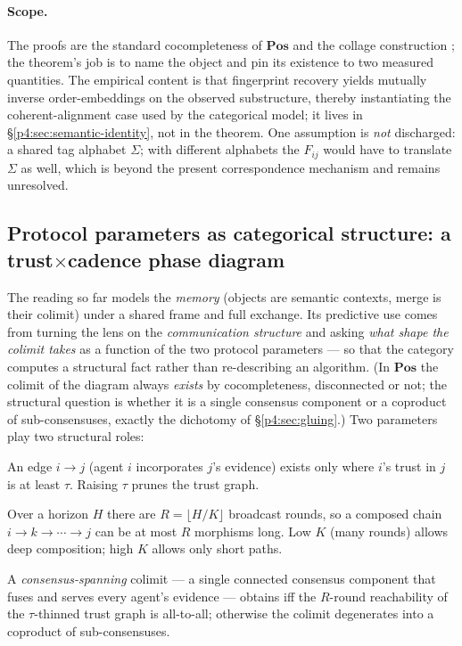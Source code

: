 \documentclass{article}
\begin{document}
\paragraph{Scope.} The proofs are the standard cocompleteness of $\mathbf{Pos}$
and the collage construction \citep{maclane1998categories}; the theorem's job
is to name the object and pin its existence to two measured quantities. The
empirical content is that fingerprint recovery yields mutually inverse
order-embeddings on the observed substructure, thereby instantiating the
coherent-alignment case used by the categorical model; it lives in
\S\ref{p4:sec:semantic-identity}, not in the theorem. One
assumption is \emph{not} discharged: a shared tag alphabet $\Sigma$; with
different alphabets the $F_{ij}$ would have to translate $\Sigma$ as well,
which is beyond the present correspondence mechanism and remains unresolved.

\subsection{Protocol parameters as categorical structure: a trust\texorpdfstring{$\times$}{x}cadence phase diagram}
\label{p4:sec:phase-diagram}

The reading so far models the \emph{memory} (objects are semantic contexts,
merge is their colimit) under a shared frame and full exchange. Its
predictive use comes from turning the lens on the \emph{communication
structure} and asking \emph{what shape the colimit takes} as a function of
the two protocol parameters --- so that the category computes a structural
fact rather than re-describing an algorithm. (In $\mathbf{Pos}$ the colimit
of the diagram always \emph{exists} by cocompleteness, disconnected or not;
the structural question is whether it is a single consensus component or a
coproduct of sub-consensuses, exactly the dichotomy of \S\ref{p4:sec:gluing}.) Two parameters play two structural roles:
\begin{description}[leftmargin=12pt,topsep=2pt,itemsep=1pt]
\item[Trust $\tau$ gates morphisms.] An edge $i\!\to\!j$ (agent $i$
incorporates $j$'s evidence) exists only where $i$'s trust in $j$ is at least
$\tau$. Raising $\tau$ prunes the trust graph.
\item[Cadence $K$ gates composition depth.] Over a horizon $H$ there are
$R=\lfloor H/K\rfloor$ broadcast rounds, so a composed chain
$i\!\to\!k\!\to\!\cdots\!\to\!j$ can be at most $R$ morphisms long. Low $K$
(many rounds) allows deep composition; high $K$ allows only short paths.
\end{description}
A \emph{consensus-spanning} colimit --- a single connected consensus
component that fuses and serves every agent's evidence --- obtains iff the
$R$-round reachability of the $\tau$-thinned trust graph is all-to-all;
otherwise the colimit degenerates into a coproduct of sub-consensuses.
\end{document}

